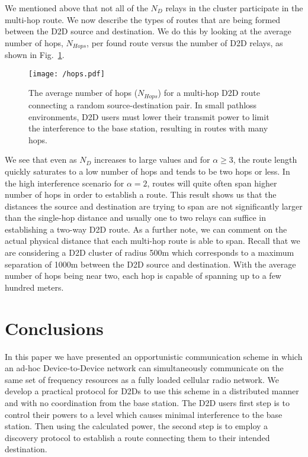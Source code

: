 \documentclass[10pt, final, journal, letterpaper,oneside, twocolumn]{IEEEtran}
\begin{document}
We mentioned above that not all of the $N_D$ relays in the cluster participate in the multi-hop route.  We now describe the types of routes that are being formed between the D2D source and destination.  We do this by looking at the average number of hops, $N_{Hops}$, per found route versus the number of D2D relays, as shown in Fig.~\ref{fig:hops}.  
\begin{figure}[htp]
\center
 \texttt{[image: /hops.pdf]}
  \caption[labelInTOC]{The average number of hops ($N_{Hops}$) for a multi-hop D2D route connecting a random source-destination pair.  In small pathloss environments, D2D users must lower their transmit power to limit the interference to the base station, resulting in routes with many hops.  }
  \label{fig:hops}
\end{figure}
We see that even as $N_D$ increases to large values and for $\alpha \geq 3$, the route length quickly saturates to a low number of hops and tends to be two hops or less.  In the high interference scenario for $\alpha = 2$, routes will quite often span higher number of hops in order to establish a route.  This result shows us that the distances the source and destination are trying to span are not significantly larger than the single-hop distance and usually one to two relays can suffice in establishing a two-way D2D route.  As a further note, we can comment on the actual physical distance that each multi-hop route is able to span.  Recall that we are considering a D2D cluster of radius 500m which corresponds to a maximum separation of 1000m between the D2D source and destination.  With the average number of hops being near two, each hop is capable of spanning up to a few hundred meters.





\section{Conclusions}
\label{sec:conclusion}
In this paper we have presented an opportunistic communication scheme in which an ad-hoc Device-to-Device network can simultaneously communicate on the same set of frequency resources as a fully loaded cellular radio network.  We develop a practical protocol for D2Ds to use this scheme in a distributed manner and with no coordination from the base station.  The D2D users first step is to control their powers to a level which causes minimal interference to the base station.   Then using the calculated power, the second step is to employ a discovery protocol to establish a route connecting them to their intended destination.  
\end{document}
